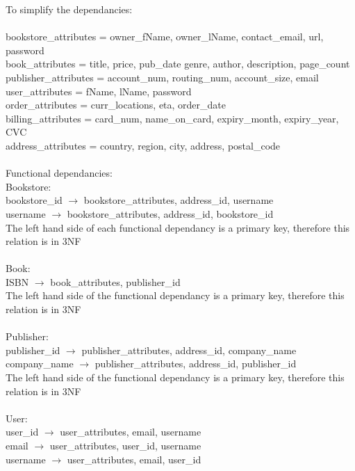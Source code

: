 \documentclass{article}
\begin{document}
To simplify the dependancies:\\\\
bookstore\_attributes = owner\_fName, owner\_lName, contact\_email, url, password\\
book\_attributes = title, price, pub\_date genre, author, description, page\_count\\
publisher\_attributes =  account\_num, routing\_num, account\_size, email\\
user\_attributes = fName, lName, password\\
order\_attributes = curr\_locations, eta, order\_date\\
billing\_attributes = card\_num, name\_on\_card, expiry\_month, expiry\_year, CVC\\
address\_attributes = country, region, city, address, postal\_code\\\\
Functional dependancies:\\
Bookstore:\\ 
bookstore\_id $\rightarrow$  bookstore\_attributes, address\_id, username\\
username $\rightarrow$  bookstore\_attributes, address\_id, bookstore\_id\\
The left hand side of each functional dependancy is a primary key, therefore this relation is in 3NF\\\\
Book:\\
ISBN $\rightarrow$  book\_attributes, publisher\_id\\
The left hand side of the functional dependancy is a primary key, therefore this relation is in 3NF\\\\
Publisher:\\
publisher\_id $\rightarrow$  publisher\_attributes, address\_id, company\_name\\
company\_name $\rightarrow$  publisher\_attributes, address\_id, publisher\_id\\
The left hand side of the functional dependancy is a primary key, therefore this relation is in 3NF\\\\
User:\\
user\_id $\rightarrow$  user\_attributes, email, username\\
email $\rightarrow$  user\_attributes, user\_id, username\\
username $\rightarrow$  user\_attributes, email, user\_id\\
\end{document}
